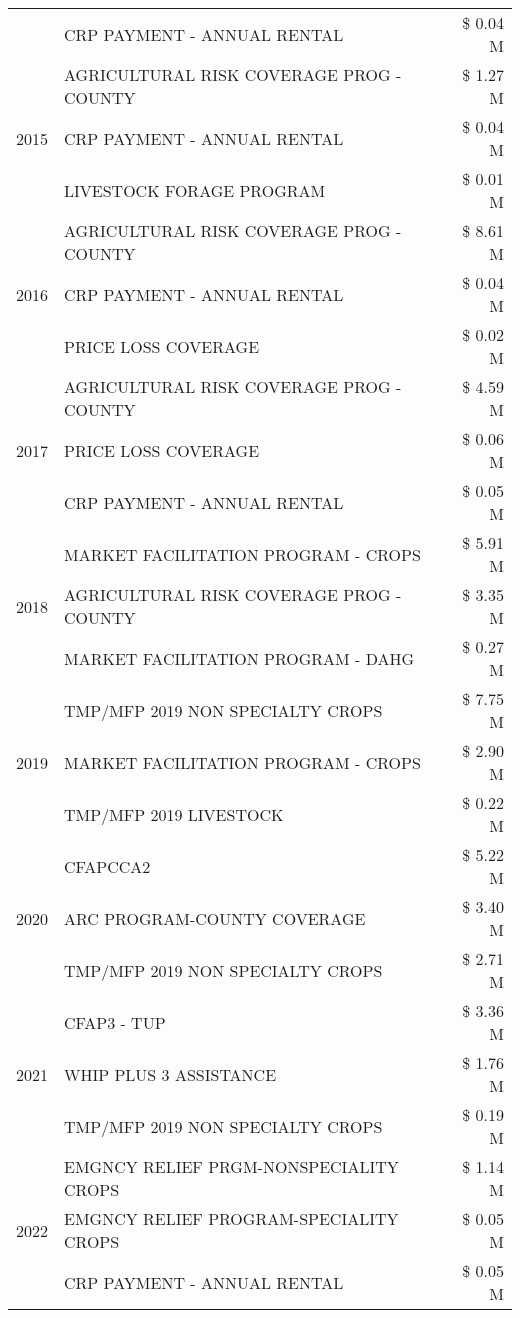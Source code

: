 \begin{tabular}{llr}
 & CRP PAYMENT - ANNUAL RENTAL & \$ 0.04 M \\
\cline{1-3}
\multirow[t]{3}{*}{2015} & AGRICULTURAL RISK COVERAGE PROG - COUNTY & \$ 1.27 M \\
 & CRP PAYMENT - ANNUAL RENTAL & \$ 0.04 M \\
 & LIVESTOCK FORAGE PROGRAM & \$ 0.01 M \\
\cline{1-3}
\multirow[t]{3}{*}{2016} & AGRICULTURAL RISK COVERAGE PROG - COUNTY & \$ 8.61 M \\
 & CRP PAYMENT - ANNUAL RENTAL & \$ 0.04 M \\
 & PRICE LOSS COVERAGE & \$ 0.02 M \\
\cline{1-3}
\multirow[t]{3}{*}{2017} & AGRICULTURAL RISK COVERAGE PROG - COUNTY & \$ 4.59 M \\
 & PRICE LOSS COVERAGE & \$ 0.06 M \\
 & CRP PAYMENT - ANNUAL RENTAL & \$ 0.05 M \\
\cline{1-3}
\multirow[t]{3}{*}{2018} & MARKET FACILITATION PROGRAM - CROPS & \$ 5.91 M \\
 & AGRICULTURAL RISK COVERAGE PROG - COUNTY & \$ 3.35 M \\
 & MARKET FACILITATION PROGRAM - DAHG & \$ 0.27 M \\
\cline{1-3}
\multirow[t]{3}{*}{2019} & TMP/MFP 2019 NON SPECIALTY CROPS & \$ 7.75 M \\
 & MARKET FACILITATION PROGRAM - CROPS & \$ 2.90 M \\
 & TMP/MFP 2019 LIVESTOCK & \$ 0.22 M \\
\cline{1-3}
\multirow[t]{3}{*}{2020} & CFAPCCA2 & \$ 5.22 M \\
 & ARC PROGRAM-COUNTY COVERAGE & \$ 3.40 M \\
 & TMP/MFP 2019 NON SPECIALTY CROPS & \$ 2.71 M \\
\cline{1-3}
\multirow[t]{3}{*}{2021} & CFAP3 - TUP & \$ 3.36 M \\
 & WHIP PLUS 3 ASSISTANCE & \$ 1.76 M \\
 & TMP/MFP 2019 NON SPECIALTY CROPS & \$ 0.19 M \\
\cline{1-3}
\multirow[t]{3}{*}{2022} & EMGNCY RELIEF PRGM-NONSPECIALITY CROPS & \$ 1.14 M \\
 & EMGNCY RELIEF PROGRAM-SPECIALITY CROPS & \$ 0.05 M \\
 & CRP PAYMENT - ANNUAL RENTAL & \$ 0.05 M \\
\cline{1-3}
\bottomrule
\end{tabular}
